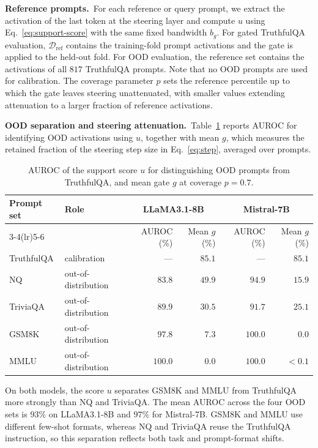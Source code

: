 \noindent\textbf{Reference prompts.}~For each reference or query prompt, we extract the activation of the last token at the steering layer and compute $u$ using Eq.~\eqref{eq:support-score} with the same fixed bandwidth $b_g$. For gated TruthfulQA evaluation, $\mathcal{D}_{\mathrm{ref}}$ contains the training-fold prompt activations and the gate is applied to the held-out fold. For OOD evaluation, the reference set contains the activations of all $817$ TruthfulQA prompts. Note that no OOD prompts are used for calibration. The coverage parameter $p$ sets the reference percentile up to which the gate leaves steering unattenuated, with smaller values extending attenuation to a larger fraction of reference activations.

\noindent\textbf{OOD separation and steering attenuation.}~Table~\ref{tab:gate-separation} reports AUROC for identifying OOD activations using $u$, together with mean $g$, which measures the retained fraction of the steering step size in Eq.~\eqref{eq:step}, averaged over prompts.
\begin{table}[ht]
\centering
\small
\caption{AUROC of the support score $u$ for distinguishing OOD prompts from TruthfulQA, and mean gate $g$ at coverage $p=0.7$.}
\label{tab:gate-separation}
\begin{tabular}{llrrrr}
\toprule
\multirow{2}{*}{Prompt set} & \multirow{2}{*}{Role} & \multicolumn{2}{c}{LLaMA3.1-8B} & \multicolumn{2}{c}{Mistral-7B} \\
\cmidrule(lr){3-4}\cmidrule(lr){5-6}
 & & AUROC (\%) & Mean $g$ (\%) & AUROC (\%) & Mean $g$ (\%) \\
\midrule
TruthfulQA & calibration & --- & $85.1$ & --- & $85.1$ \\
NQ         & out-of-distribution & $83.8$ & $49.9$ & $94.9$ & $15.9$ \\
TriviaQA   & out-of-distribution & $89.9$ & $30.5$ & $91.7$ & $25.1$ \\
GSM8K      & out-of-distribution & $97.8$ & $7.3$ & $100.0$ & $0.0$ \\
MMLU       & out-of-distribution & $100.0$ & $0.0$ & $100.0$ & $<0.1$ \\
\bottomrule
\end{tabular}
\end{table}

On both models, the score $u$ separates GSM8K and MMLU from TruthfulQA more strongly than NQ and TriviaQA. The mean AUROC across the four OOD sets is $93\%$ on LLaMA3.1-8B and $97\%$ for Mistral-7B. GSM8K and MMLU use different few-shot formats, whereas NQ and TriviaQA reuse the TruthfulQA instruction, so this separation reflects both task and prompt-format shifts.

